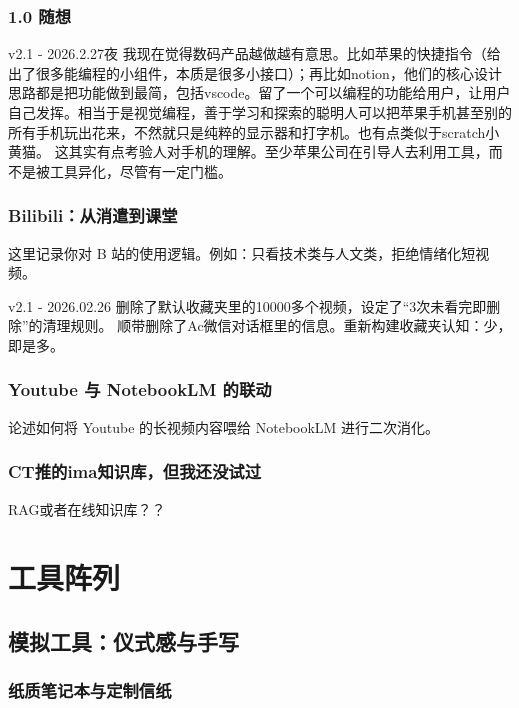 \documentclass[11pt, a4paper, oneside]{book}
\begin{document}
\section*{1.0  随想}

\begin{flowing}{v2.1 - 2026.2.27夜}
    我现在觉得数码产品越做越有意思。比如苹果的快捷指令（给出了很多能编程的小组件，本质是很多小接口）；再比如notion，他们的核心设计思路都是把功能做到最简，包括vscode。留了一个可以编程的功能给用户，让用户自己发挥。相当于是视觉编程，善于学习和探索的聪明人可以把苹果手机甚至别的所有手机玩出花来，不然就只是纯粹的显示器和打字机。也有点类似于scratch小黄猫。
这其实有点考验人对手机的理解。至少苹果公司在引导人去利用工具，而不是被工具异化，尽管有一定门槛。
\end{flowing}

\section{Bilibili：从消遣到课堂}
这里记录你对 B 站的使用逻辑。例如：只看技术类与人文类，拒绝情绪化短视频。

\begin{updatelog}{v2.1 - 2026.02.26}
    删除了默认收藏夹里的10000多个视频，设定了“3次未看完即删除”的清理规则。
    顺带删除了Ac微信对话框里的信息。重新构建收藏夹认知：少，即是多。
\end{updatelog}

\section{Youtube 与 NotebookLM 的联动}
论述如何将 Youtube 的长视频内容喂给 NotebookLM 进行二次消化。

\section{CT推的ima知识库，但我还没试过}
RAG或者在线知识库？？
\part{工具阵列}

\chapter{模拟工具：仪式感与手写}
\section{纸质笔记本与定制信纸}
\end{document}
